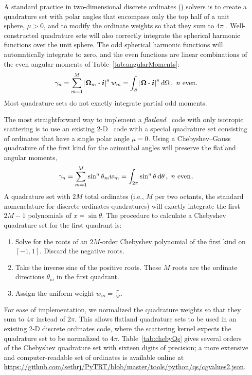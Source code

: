 A standard practice in two-dimensional discrete ordinates (\SN) solvers is to
create a quadrature set with polar angles that encompass only the top half of a
unit sphere, $\mu>0$, and to modify the ordinate weights so that they sum to
$4\pi$
\cite{Zik1997}. Well-constructed quadrature sets will also correctly
integrate the spherical harmonic functions \cite{Rab2007} over the unit sphere.
The odd spherical harmonic functions will automatically integrate to zero, and
the even
functions are linear combinations of the even angular moments of
Table~\ref{tab:angularMoments}:
\begin{equation*}
  \gamma_n
  = \sum_{m=1}^{M} \abs{ \vec{\Omega}_m \vd \vec{i}}^n w_m
  = \int_S \abs{ \vec{\Omega}\vd\vec{i} }^n \ud\Omega \,,\ n\ \text{even}.
\end{equation*}
Most quadrature sets do not exactly integrate partial odd moments.

The most straightforward way to implement a \emph{flatland} \SN\
code with only isotropic scattering is to use an existing 2-D \SN\ code with a
special quadrature set
consisting of ordinates that have a single
polar angle $\mu=0$. Using a Chebyshev--Gauss quadrature of the first kind
\cite{Str1966a} for the azimuthal angles will preserve the flatland angular moments,
\begin{equation*}
  \gamma_n
  = \sum_{m=1}^{M} \sin^n \theta_m w_m
  = \int_{2\pi} \sin^n \theta \mathop{}\!\mathrm{d}\theta\,,\ n\ \text{even} \,.
\end{equation*}
A quadrature set with $2M$ total ordinates (i.e., $M$ per two octants, the
standard nomenclature for discrete ordinates quadratures) will exactly integrate
the first $2M-1$ polynomials of $x=\sin \theta$. The procedure to calculate
a Chebyshev quadrature set for the first quadrant is:
\begin{enumerate}
  \item Solve for the roots of an $2M$-order Chebyshev polynomial of the first
    kind on $[-1,1]$. Discard the negative roots.
  \item Take the inverse sine of the positive roots. These $M$ roots are the
    ordinate directions $\theta_m$ in the first quadrant.
  \item Assign the uniform weight $w_m = \frac{\pi}{M}$.
\end{enumerate}
For ease of implementation, we normalized the quadrature weights so that they sum
to $4\pi$ instead of $2\pi$. This allows flatland quadrature sets to be used in
an existing 2-D discrete ordinates code, where the scattering kernel expects the
quadrature set to be normalized to $4\pi$. Table~\ref{tab:chebyQs} gives several
orders of the Chebyshev quadrature set with sixteen digits of precision; a more
extensive and computer-readable set of ordinates is available online at
\url{https://github.com/sethrj/PyTRT/blob/master/tools/python/qs/cgvalues2.json}.

